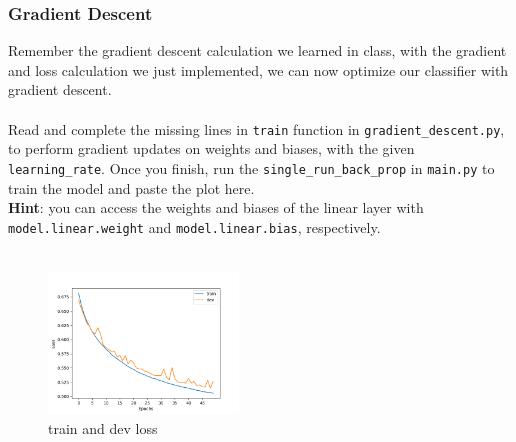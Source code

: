\subsubsection{Gradient Descent}
Remember the gradient descent calculation we learned in class, with the gradient and loss calculation we just implemented, we can now optimize our classifier with gradient descent.\\\\
\noindent \todo{} Read and complete the missing lines in \texttt{train} function in \texttt{gradient\_descent.py}, to perform gradient updates on weights and biases, with the given \texttt{learning\_rate}. Once you finish, run the \texttt{single\_run\_back\_prop} in \texttt{main.py} to train the model and paste the plot here.
\\
\noindent \textbf{Hint}: you can access the weights and biases of the linear layer with \texttt{model.linear.weight} and \texttt{model.linear.bias}, respectively.\\
\noindent {\color{red}{your plot:}}\\
\begin{figure}[h]
    \centering
    \includegraphics[width=0.45\textwidth]{gradient_descent_loss.png}
    \caption{train and dev loss}
\end{figure}\\





